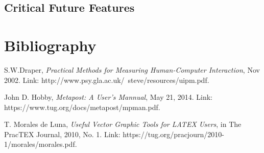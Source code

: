 \documentclass[10pt,conference, twocolumn]{IEEEtran}
\begin{document}
\subsection{Critical Future Features}






\section{Bibliography}

\begin{thebibliography}{1}

 S.W.Draper, \emph{Practical Methods for Measuring Human-Computer Interaction}, Nov 2002. Link: http://www.psy.gla.ac.uk/~steve/resources/uipm.pdf.

John D. Hobby, \emph{Metapost: A User's Mannual}, May 21, 2014. Link: https://www.tug.org/docs/metapost/mpman.pdf.

T. Morales de Luna, \emph{Useful Vector Graphic Tools for LATEX Users}, in The PracTEX Journal, 2010, No. 1. Link: https://tug.org/pracjourn/2010-1/morales/morales.pdf.

\end{thebibliography}
\end{document}
